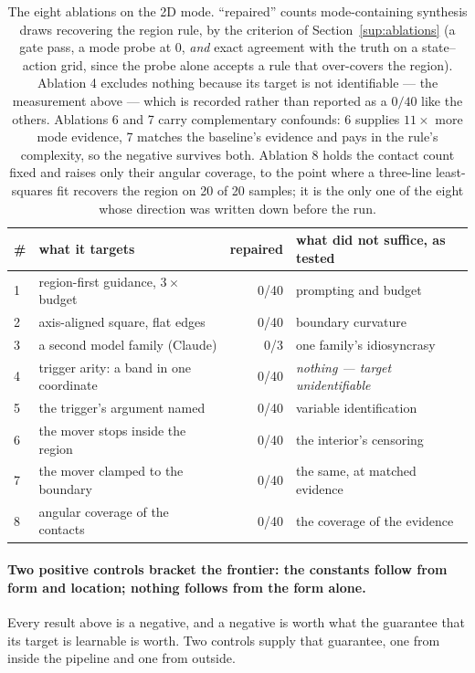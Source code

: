 \documentclass[11pt]{article}
\theoremstyle{definition}
\theoremstyle{remark}
\begin{document}
\begin{table}[ht]
\centering
\small
\begin{tabular}{llrl}
\toprule
\# & what it targets & repaired & what did not suffice, as tested \\
\midrule
1 & region-first guidance, $3\times$ budget & 0/40 & prompting and budget \\
2 & axis-aligned square, flat edges & 0/40 & boundary curvature \\
3 & a second model family (Claude) & 0/3 & one family's idiosyncrasy \\
4 & trigger arity: a band in one coordinate & 0/40 & \emph{nothing --- target unidentifiable} \\
5 & the trigger's argument named & 0/40 & variable identification \\
6 & the mover stops inside the region & 0/40 & the interior's censoring \\
7 & the mover clamped to the boundary & 0/40 & the same, at matched evidence \\
8 & angular coverage of the contacts & 0/40 & the coverage of the evidence \\
\bottomrule
\end{tabular}
\caption{The eight ablations on the 2D mode. ``repaired'' counts mode-containing synthesis
draws recovering the region rule, by the criterion of Section~\ref{sup:ablations} (a gate
pass, a mode probe at $0$, \emph{and} exact agreement with the truth on a state--action
grid, since the probe alone accepts a rule that over-covers the region). Ablation 4 excludes
nothing because its target is not identifiable --- the measurement above --- which is
recorded rather than reported as a $0/40$ like the others. Ablations 6 and 7 carry
complementary confounds: 6 supplies $11\times$ more mode evidence, 7 matches the baseline's
evidence and pays in the rule's complexity, so the negative survives both. Ablation 8 holds
the contact count fixed and raises only their angular coverage, to the point where a
three-line least-squares fit recovers the region on 20 of 20 samples; it is the only one of
the eight whose direction was written down before the run.}
\label{tab:ablations}
\end{table}

\paragraph{Two positive controls bracket the frontier: the constants follow from form and location; nothing follows from the form alone.} Every result above is a negative, and a negative is worth what the guarantee that its target is learnable is worth. Two controls supply that guarantee, one from inside the pipeline and one from outside.
\end{document}
